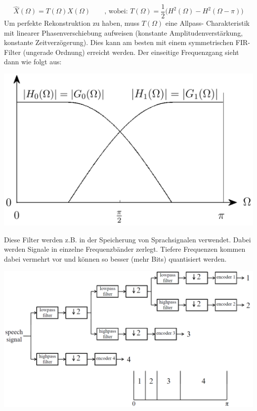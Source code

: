 \[ \hat{X}(\Omega) = T(\Omega)X(\Omega) \qquad \text{, wobei: } 
				T(\Omega) = \frac{1}{2}\bigg(H^2(\Omega) -H^2(\Omega-\pi)\bigg) \]
Um perfekte Rekonstruktion zu haben, muss $T(\Omega)$ eine Allpass-
Charakteristik mit linearer Phasenverschiebung aufweisen (konstante Amplitudenverstärkung, konstante Zeitverzögerung). 
Dies kann am besten mit einem symmetrischen FIR-Filter (ungerade Ordnung) erreicht werden. Der einseitige Frequenzgang
sieht dann wie folgt aus:
\begin{center}
	\includegraphics[width=.5\textwidth]{../fig/power_symetric}
\end{center}
Diese Filter werden z.B. in der Speicherung von Sprachsignalen verwendet. 
Dabei werden Signale in einzelne Frequenzbänder zerlegt. Tiefere Frequenzen 
kommen dabei vermehrt vor und können so besser (mehr Bits) quantisiert werden.
\begin{center}
	\includegraphics[width=.7\textwidth]{../fig/quadrature_mirror_ex}
\end{center}

